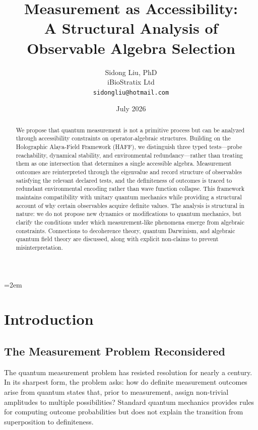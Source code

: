 \documentclass[12pt,a4paper]{article}
\title{Measurement as Accessibility:\\
A Structural Analysis of Observable Algebra Selection}
\author{
  Sidong Liu, PhD \\
  iBioStratix Ltd \\
  \texttt{sidongliu@hotmail.com}
}
\date{July 2026}
\begin{document}
\emergencystretch=2em
\raggedbottom
{}

\maketitle

\begin{abstract}
We propose that quantum measurement is not a primitive process but can be analyzed through accessibility constraints on operator-algebraic structures. Building on the Holographic Alaya-Field Framework (HAFF), we distinguish three typed tests---probe reachability, dynamical stability, and environmental redundancy---rather than treating them as one intersection that determines a single accessible algebra. Measurement outcomes are reinterpreted through the eigenvalue and record structure of observables satisfying the relevant declared tests, and the definiteness of outcomes is traced to redundant environmental encoding rather than wave function collapse. This framework maintains compatibility with unitary quantum mechanics while providing a structural account of why certain observables acquire definite values. The analysis is structural in nature: we do not propose new dynamics or modifications to quantum mechanics, but clarify the conditions under which measurement-like phenomena emerge from algebraic constraints. Connections to decoherence theory, quantum Darwinism, and algebraic quantum field theory are discussed, along with explicit non-claims to prevent misinterpretation.
\end{abstract}

\section{Introduction}
\label{sec:intro}

\subsection{The Measurement Problem Reconsidered}

The quantum measurement problem has resisted resolution for nearly a century. In its sharpest form, the problem asks: how do definite measurement outcomes arise from quantum states that, prior to measurement, assign non-trivial amplitudes to multiple possibilities? Standard quantum mechanics provides rules for computing outcome probabilities but does not explain the transition from superposition to definiteness.
\end{document}

